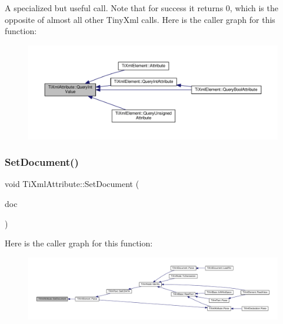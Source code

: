 A specialized but useful call. Note that for success it returns 0, which is the opposite of almost all other Tiny\+Xml calls. Here is the caller graph for this function\+:
\nopagebreak
\begin{figure}[H]
\begin{center}
\leavevmode
\includegraphics[width=350pt]{class_ti_xml_attribute_a6caa8090d2fbb7966700a16e45ed33de_icgraph}
\end{center}
\end{figure}
\mbox{\label{class_ti_xml_attribute_ac12a94d4548302afb12f488ba101f7d1}} 
\subsubsection{\texorpdfstring{Set\+Document()}{SetDocument()}}
{\footnotesize\ttfamily void Ti\+Xml\+Attribute\+::\+Set\+Document (\begin{DoxyParamCaption}\item[{\hyperlink{class_ti_xml_document}{Ti\+Xml\+Document} $\ast$}]{doc }\end{DoxyParamCaption})\hspace{0.3cm}{\ttfamily [inline]}}

Here is the caller graph for this function\+:
\nopagebreak
\begin{figure}[H]
\begin{center}
\leavevmode
\includegraphics[width=350pt]{class_ti_xml_attribute_ac12a94d4548302afb12f488ba101f7d1_icgraph}
\end{center}
\end{figure}
\mbox{\label{class_ti_xml_attribute_a0316da31373496c4368ad549bf711394}} 
